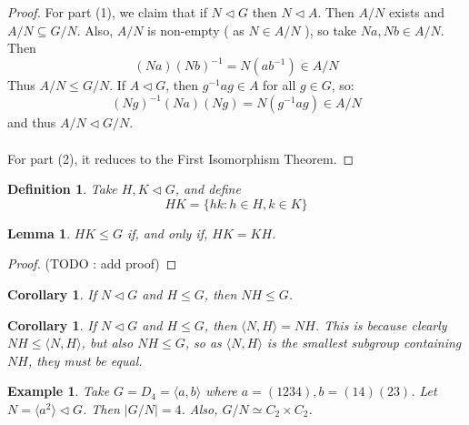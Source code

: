 \documentclass[a4paper,10pt]{article}
\newtheorem{Def}[thm]{Definition}
\newtheorem{Cor}[thm]{Corollary}
\newtheorem{eg}[thm]{Example}
\newtheorem{Lem}[thm]{Lemma}
\begin{document}
\begin{proof}
For part (1), we claim that if $N \triangleleft G$ then $N \triangleleft A$. Then $A / N$ exists and $A / N \subseteq G / N$. Also, $A / N$ is non-empty ( as $N \in A / N$ ), so take $Na, Nb \in A/N$. Then
\[ (Na)(Nb)^{-1} = N(ab^{-1}) \in A / N \]
Thus $A / N \leq G / N$. If $A \triangleleft G$, then $g^{-1} a g \in A$ for all $g \in G$, so:
\[ (Ng)^{-1} (Na) (Ng) = N(g^{-1}ag) \in A / N \]
and thus $A / N \triangleleft G / N$.  \\
\\
For part (2), it reduces to the First Isomorphism Theorem. 
\end{proof}

\begin{Def}
Take $H,K \triangleleft G$, and define
\[ HK = \{ hk : h\in H, k\in K \} \]
\end{Def}
\begin{Lem}
$HK \leq G$ if, and only if, $HK = KH$. 
\end{Lem}
\begin{proof}
(TODO : add proof)
\end{proof}
\begin{Cor}
If $N \triangleleft G$ and $H \leq G$, then $NH \leq G$. 
\end{Cor}
\begin{Cor}
If $N \triangleleft G$ and $H \leq G$, then $\langle N, H \rangle = NH$. This is because clearly $NH \leq \langle N, H \rangle$, but also $NH \leq G$, so as $\langle N, H \rangle$ is the smallest subgroup containing $NH$, they must be equal.
\end{Cor}
\begin{eg}
Take $G = D_4 = \langle a , b \rangle$ where $a = (1234), b =(14)(23)$. Let $N = \langle a^2 \rangle \triangleleft G$. Then $| G / N | = 4$. Also, $G / N \simeq C_2 \times C_2$.
\end{eg}


\newpage
\end{document}
